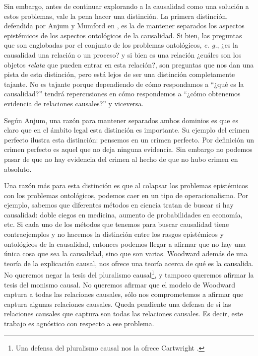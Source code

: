 Sin embargo, antes de continuar explorando a la causalidad como una solución a estos problemas, vale la pena hacer una distinción. La primera distinción, defendida por Anjum y Mumford en \citeyear{Anjum2018}, es la de mantener separados los aspectos epistémicos de los aspectos ontológicos de la causalidad. Si bien, las preguntas que son englobadas por el conjunto de los problemas ontológicos, \textit{e. g.}, ¿es la causalidad una relación o un proceso? y si bien es una relación ¿cuáles son los objetos \textit{relata} que pueden entrar en esta relación?, son preguntas que nos dan una pista de esta distinción, pero está lejos de ser una distinción completamente tajante. No es tajante porque dependiendo de cómo respondamos a ``¿qué es la causalidad?'' tendrá repercusiones en cómo respondemos a ``¿cómo obtenemos evidencia de relaciones causales?'' y viceversa.

Según Anjum, una razón para mantener separados ambos dominios es que es claro que en el ámbito legal esta distinción es importante. Su ejemplo del crimen perfecto ilustra esta distinción: pensemos en un crimen perfecto. Por definición un crimen perfecto es aquel que no deja ninguna evidencia. Sin embargo no podemos pasar de que no hay evidencia del crimen al hecho de que no hubo crimen en absoluto.

Una razón más para esta distinción es que al colapsar los problemas epistémicos con los problemas ontológicos, podemos caer en un tipo de operacionalismo. Por ejemplo, sabemos que diferentes métodos en ciencia tratan de buscar si hay causalidad: doble ciegos en medicina, aumento de probabilidades en economía, etc. Si cada uno de los métodos que tenemos para buscar causalidad tiene contraejemplos y no hacemos la distinción entre los rasgos epistémicos y ontológicos de la causalidad, entonces podemos llegar a afirmar que no hay una única cosa que sea la causalidad, sino que son varias. Woodward además de una teoría de la explicación causal, nos ofrece una teoría acerca de qué es la causalida. No queremos negar la tesis del pluralismo causal\footnote{Una defensa del pluralismo causal nos la ofrece Cartwright \citeyear{Cartwright2007}.}, y tampoco queremos afirmar la tesis del monismo causal. No queremos afirmar que el modelo de Woodward captura a todas las relaciones causales, sólo nos comprometemos a afirmar que captura algunas relaciones causales. Queda pendiente una defensa de si las relaciones causales que captura son todas las relaciones causales. Es decir, este trabajo es agnóstico con respecto a ese problema.

